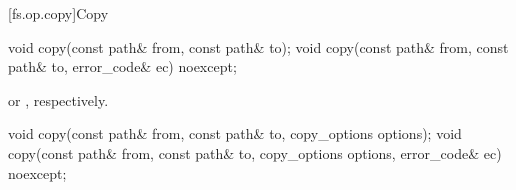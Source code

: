 [fs.op.copy]{Copy}

%
\begin{itemdecl}
void copy(const path& from, const path& to);
void copy(const path& from, const path& to, error_code& ec) noexcept;
\end{itemdecl}

\begin{itemdescr}
\pnum
\effects {}
or , respectively.
\end{itemdescr}

%
\begin{itemdecl}
void copy(const path& from, const path& to, copy_options options);
void copy(const path& from, const path& to, copy_options options,
          error_code& ec) noexcept;
\end{itemdecl}

